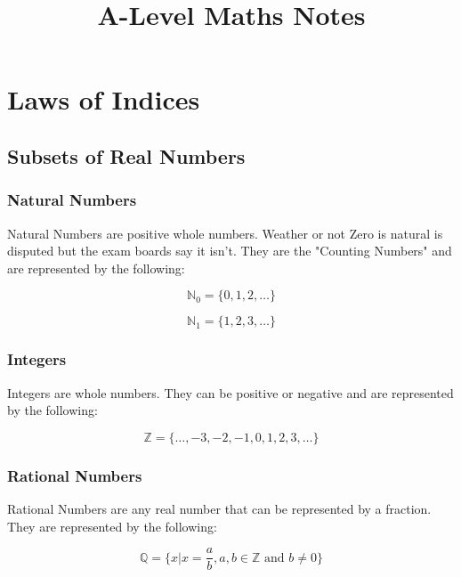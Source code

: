 \documentclass{article}
\begin{document}
\title{A-Level Maths Notes}
\maketitle

\section{Laws of Indices}

\subsection{Subsets of Real Numbers}

\subsubsection{Natural Numbers}
Natural Numbers are positive whole numbers. Weather or not Zero is natural
is disputed but the exam boards say it isn't. They are the "Counting Numbers"
 and are represented by the following:

\begin{equation}
    \label{simple_equation}
    \mathbb{N}_0 = \{0, 1, 2, \dots\}
\end{equation}

\begin{equation}
	\label{simple_equation}
    \mathbb{N}_1 = \{1, 2, 3, \dots\}
\end{equation}

\subsubsection{Integers}
Integers are whole numbers. They can be positive or negative  and are represented by the following:

\begin{equation}
    \label{simple_equation}
    \mathbb{Z} = \{\dots, -3, -2, -1, 0, 1, 2, 3, \dots\}
\end{equation}

\subsubsection{Rational Numbers}
Rational Numbers are any real number that can be represented by a fraction. They are represented by the following:

\begin{equation}
	\label{simple_equation}
	\mathbb{Q} = \{ x | x = \frac{a}{b}, a,b \in \mathbb{Z} \text{ and } b \ne 0 \}
\end{equation}
\end{document}

